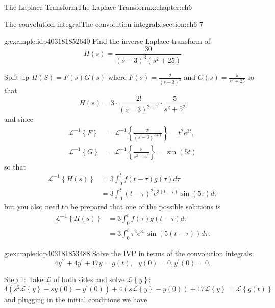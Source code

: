 \documentclass[oneside,10pt,]{book}
\numberwithin{equation}{section}
\numberwithin{equation}{section}
\newcommand{\amp}{&}
\begin{document}
\begin{chapterptx}{The Laplace Transform}{}{The Laplace Transform}{}{}{x:chapter:ch6}
\begin{sectionptx}{The convolution integral}{}{The convolution integral}{}{}{x:section:ch6-7}
\begin{example}{}{g:example:idp403181852640}%
Find the inverse Laplace transform of%
\begin{equation*}
H(s)=\frac{30}{\left(s-3\right)^{3}(s^{2}+25)}
\end{equation*}
%
\par
Split up \(H(S)=F(s)G(s)\) where \(F(s)=\frac{2}{(s-3)^{3}}\) and \(G(s)=\frac{5}{s^{2}+25}\) so that%
\begin{equation*}
H(s)=3\cdot\frac{2!}{(s-3)^{2+1}}\cdot\frac{5}{s^{2}+5^{2}}
\end{equation*}
and since%
\begin{align*}
\mathcal{L}^{-1}\left\{ F\right\}  \amp =\mathcal{L}^{-1}\left\{ \frac{2!}{(s-3)^{2+1}}\right\} =t^{2}e^{3t},\\
\mathcal{L}^{-1}\left\{ G\right\}  \amp =\mathcal{L}^{-1}\left\{ \frac{5}{s^{2}+5^{2}}\right\} =\sin\left(5t\right)
\end{align*}
so that%
\begin{align*}
\mathcal{L}^{-1}\left\{ H(s)\right\}  \amp =3\int_{0}^{t}f(t-\tau)g(\tau)d\tau\\
\amp =3\int_{0}^{t}(t-\tau)^{2}e^{3(t-\tau)}\sin\left(5\tau\right)d\tau
\end{align*}
but you also need to be prepared that one of the possible solutions is%
\begin{align*}
\mathcal{L}^{-1}\left\{ H(s)\right\}  \amp =3\int_{0}^{t}f(\tau)g(t-\tau)d\tau\\
\amp =3\int_{0}^{t}\tau^{2}e^{3\tau}\sin\left(5\left(t-\tau\right)\right)d\tau.
\end{align*}
%
\end{example}
\begin{example}{}{g:example:idp403181853488}%
Solve the IVP in terms of the convolution integrals:%
\begin{equation*}
4y^{\prime\prime}+4y^{\prime}+17y=g(t),\,\,\,\,y(0)=0,y^{\prime}(0)=0.
\end{equation*}
%
\par
Step 1: Take \(\mathcal{L}\) of both sides and solve \(\mathcal{L}\left\{ y\right\} \):%
\begin{equation*}
4\left(s^{2}\mathcal{L}\left\{ y\right\} -sy(0)-y^{\prime}(0)\right)+4\left(s\mathcal{L}\left\{ y\right\} -y(0)\right)+17\mathcal{L}\left\{ y\right\} =\mathcal{L}\left\{ g(t)\right\} 
\end{equation*}
and plugging in the initial conditions we have%
\begin{equation*}

\end{equation*}
\end{example}
\end{sectionptx}
\end{chapterptx}
\end{document}
